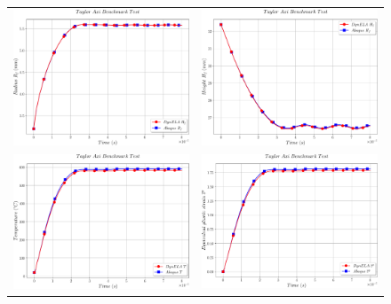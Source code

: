 \begin{figure}[h]
\begin{centering}
\begin{tabular}{cc}
\includegraphics[width=0.45\columnwidth]{Figures/Samples/Impact/Taylor-Axi_radius} & \includegraphics[width=0.45\columnwidth]{Figures/Samples/Impact/Taylor-Axi_height}\tabularnewline
\includegraphics[width=0.45\columnwidth]{Figures/Samples/Impact/Taylor-Axi_temperature} & \includegraphics[width=0.45\columnwidth]{Figures/Samples/Impact/Taylor-Axi_plasticStrain}\tabularnewline

\end{tabular}
\end{centering}
\end{figure}
